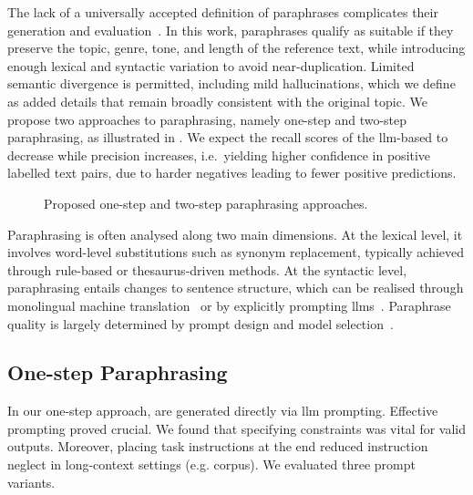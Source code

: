 The lack of a universally accepted definition of paraphrases complicates their generation and evaluation~\citep{gohsen_task_oriented_2024}. 
In this work, paraphrases qualify as suitable \imps{} if they preserve the topic, genre, tone, and length of the reference text, while introducing enough lexical and syntactic variation to avoid near-duplication. 
Limited semantic divergence is permitted, including mild hallucinations, which we define as added details that remain broadly consistent with the original topic.
We propose two approaches to paraphrasing, namely one-step and two-step paraphrasing, as illustrated in .
We expect the recall scores of the \ac{llm}-based \impAppr{} to decrease while precision increases, i.e.\ yielding higher confidence in positive labelled text pairs, due to harder negatives leading to fewer positive predictions.

\begin{figure}[h]
    \centering
    
    \caption[Different paraphrasing approaches]{Proposed one-step and two-step paraphrasing approaches.}
    \label{fig:paraphrasing_approaches}
\end{figure}


Paraphrasing is often analysed along two main dimensions. 
At the lexical level, it involves word-level substitutions such as synonym replacement, typically achieved through rule-based or thesaurus-driven methods. 
At the syntactic level, paraphrasing entails changes to sentence structure, which can be realised through monolingual machine translation~\citep{zhou_paraphrase_2021} or by explicitly prompting \acp{llm}~\citep{kurt_pehlivanoglu_comparative_2024}.
Paraphrase quality is largely determined by prompt design and model selection~\citep{Wu_ODD_challenges_2025}.


\subsection{One-step Paraphrasing}
\label{subsec:one_step_paraphrasing_prompts}

In our one-step approach, \imps{} are generated directly via \ac{llm} prompting. 
Effective prompting proved crucial. 
We found that specifying constraints was vital for valid outputs. 
Moreover, placing task instructions at the end reduced instruction neglect in long-context settings (e.g. \dataGutenberg{} corpus). 
We evaluated three prompt variants.

